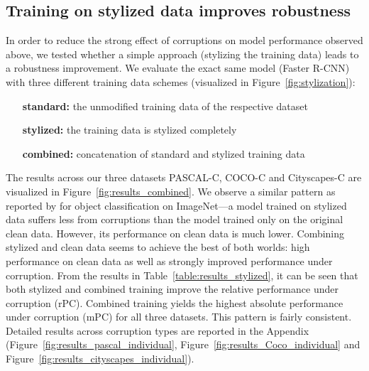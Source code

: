 \documentclass{article}
\begin{document}
\subsection{Training on stylized data improves robustness}
\label{subse:stylized_training}
In order to reduce the strong effect of corruptions on model performance observed above, we tested whether a simple approach (stylizing the training data) leads to a robustness improvement. We evaluate the exact same model (Faster R-CNN) with three different training data schemes (visualized in Figure~\ref{fig:stylization}):
\begin{itemize}[leftmargin=2.6cm, nosep]
    \item[\textbf{standard:}] the unmodified training data of the respective dataset
    \item[\textbf{stylized:}] the training data is stylized completely
    \item[\textbf{combined:}] concatenation of standard and stylized training data
\end{itemize}

\noindent
The results across our three datasets PASCAL-C, COCO-C and Cityscapes-C are visualized in Figure~\ref{fig:results_combined}. We observe a similar pattern as reported by \cite{geirhos2019imagenettrained} for object classification on ImageNet---a model trained on stylized data suffers less from corruptions than the model trained only on the original clean data. However, its performance on clean data is much lower. Combining stylized and clean data seems to achieve the best of both worlds: high performance on clean data as well as strongly improved performance under corruption. From the results in Table~\ref{table:results_stylized}, it can be seen that both stylized and combined training improve the relative performance under corruption (rPC). Combined training yields the highest absolute performance under corruption (mPC) for all three datasets. This pattern is fairly consistent. Detailed results across corruption types are reported in the Appendix (Figure~\ref{fig:results_pascal_individual}, Figure~\ref{fig:results_Coco_individual} and  Figure~\ref{fig:results_cityscapes_individual}).
\end{document}
